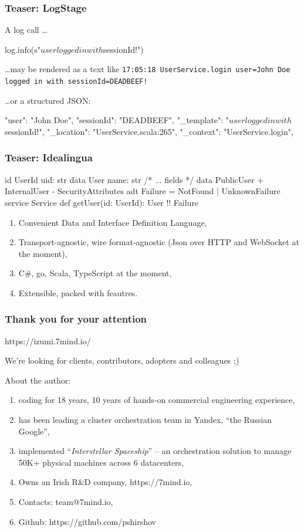 \documentclass[usenames,dvipsnames]{beamer}
\begin{document}
\begin{frame}[fragile]
\frametitle{Teaser: LogStage}
A log call \dots
\begin{scalacode}
log.info(s"$user logged in with $sessionId!")
\end{scalacode}

\dots may be rendered as a text like \texttt{17:05:18 UserService.login user=John Doe logged in with sessionId=DEADBEEF!}

\dots or a structured JSON:
\begin{jsoncode}
{
  "user": "John Doe",
  "sessionId": "DEADBEEF",
  "_template": "$user logged in with $sessionId!",
  "_location": "UserService.scala:265",
  "_context": "UserService.login",
}
\end{jsoncode}
\end{frame}

\begin{frame}[fragile]
\frametitle{Teaser: Idealingua}
\begin{textcode}
id UserId { uid: str }
data User {  name: str /* ... fields */ }
data PublicUser {
 + InternalUser
 - SecurityAttributes 
}
adt Failure = NotFound | UnknownFailure
service Service {
  def getUser(id: UserId): User !! Failure
}
\end{textcode}

\begin{enumerate}
\item Convenient Data and Interface Definition Language,
\item Transport-agnostic, wire format-agnostic (Json over HTTP and WebSocket at the moment),
\item C\#, go, Scala, TypeScript at the moment,
\item Extensible, packed with feautres.
\end{enumerate}
\end{frame}

\begin{frame}
    \frametitle{Thank you for your attention}

    \begin{center}
      https://izumi.7mind.io/

      We're looking for clients, contributors, adopters and colleagues ;)
    \end{center}

    About the author:
    \begin{enumerate}
        \item coding for 18 years, 10 years of hands-on commercial engineering experience,
        \item has been leading a cluster orchestration team in Yandex, ``the Russian Google'',
        \item implemented ``\textit{Interstellar Spaceship}'' -- an orchestration solution to manage 50K+ physical machines across 6 datacenters,
        \item Owns an Irish R\&D company, https://7mind.io,
        \item Contacts: team@7mind.io,
        \item Github: https://github.com/pshirshov
    \end{enumerate}
\end{frame}
\end{document}
